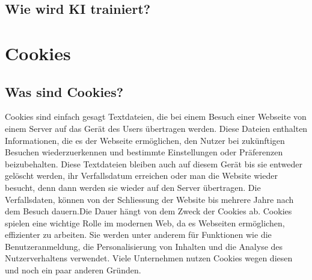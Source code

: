 \documentclass{article}
\begin{document}
\subsection{Wie wird KI trainiert?}

\section{Cookies}

\subsection{Was sind Cookies?}
Cookies sind einfach gesagt Textdateien, die bei einem Besuch einer Webseite von einem Server auf das Gerät des Users übertragen werden. Diese Dateien enthalten Informationen, die es der Webseite ermöglichen, den Nutzer bei zukünftigen Besuchen wiederzuerkennen und bestimmte Einstellungen oder Präferenzen beizubehalten. Diese Textdateien bleiben auch auf diesem Gerät bis sie entweder gelöscht werden, ihr Verfallsdatum erreichen oder man die Website wieder besucht, denn dann werden sie wieder auf den Server übertragen. Die Verfallsdaten, können  von der Schliessung der Website bis mehrere Jahre nach dem Besuch dauern.Die Dauer hängt von dem Zweck der Cookies ab. Cookies spielen eine wichtige Rolle im modernen Web, da es Webseiten ermöglichen, effizienter zu arbeiten. Sie werden unter anderem für Funktionen wie die Benutzeranmeldung, die Personalisierung von Inhalten und die Analyse des Nutzerverhaltens verwendet. Viele Unternehmen nutzen Cookies wegen diesen und noch ein paar anderen Gründen.
\end{document}
